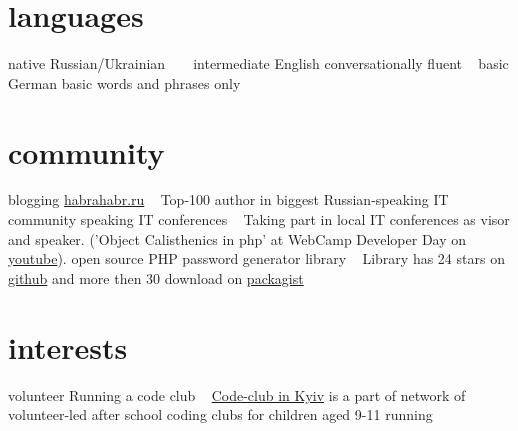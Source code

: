 \documentclass[hidelinks,a4paper]{cv}
\begin{document}
\section{languages}
\begin{entrylist}
  \entry
   {native}
   {Russian/Ukrainian}
   {~}
   {~}
  \entry
   {intermediate}
   {English}
   {conversationally fluent}
   {~}
  \entry
   {basic}
   {German}
   {basic words and phrases only}
   {~}
\end{entrylist}

\section{community}
\begin{entrylist}
   \entry
    {blogging}
    {\href{http://habrahabr.ru/users/patapsmile/}{habrahabr.ru}}
    {~}
    {Top-100 author in biggest Russian-speaking IT community}
   \entry
    {speaking}
    {IT conferences}
    {~}
    {Taking part in local IT conferences as visor and speaker. 
    ('Object Calisthenics in php' at WebCamp Developer Day on \href{https://www.youtube.com/watch?v=jVPtLG7q8OQ}{youtube}). 
    }
   \entry
    {open source}
    {PHP password generator library}
    {~}
    {Library has 24 stars on \href{https://github.com/denys-potapov/password-generator}{github} and more then 30 download on \href{https://packagist.org/packages/barzo/password-generator}{packagist}
    }
\end{entrylist}


\section{interests}
\begin{entrylist}
   \entry
    {volunteer}
    {Running a code club}
    {~}
    {\href{https://www.codeclub.org.uk/}{Code-club in Kyiv} is a part of network of volunteer-led after school coding clubs for children aged 9-11}
   \entry
    {running}
    {~}
    {~}
    {~}
\end{entrylist}
\end{document}
